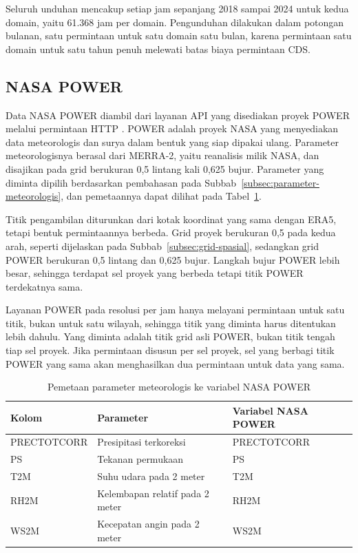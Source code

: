 Seluruh unduhan mencakup setiap jam sepanjang 2018 sampai 2024 untuk kedua domain, yaitu 61.368 jam per domain.
Pengunduhan dilakukan dalam potongan bulanan, satu permintaan untuk satu domain satu bulan, karena permintaan satu domain untuk satu tahun penuh melewati batas biaya permintaan CDS.

\subsection{NASA POWER}
\label{subsec:power}
Data NASA POWER diambil dari layanan API yang disediakan proyek POWER melalui permintaan HTTP \autocite{nasapower}.
POWER adalah proyek NASA yang menyediakan data meteorologis dan surya dalam bentuk yang siap dipakai ulang.
Parameter meteorologisnya berasal dari MERRA-2, yaitu reanalisis milik NASA, dan disajikan pada grid berukuran 0,5\textdegree{} lintang kali 0,625\textdegree{} bujur.
Parameter yang diminta dipilih berdasarkan pembahasan pada Subbab~\ref{subsec:parameter-meteorologis}, dan pemetaannya dapat dilihat pada Tabel~\ref{tab:power-variabel}.

Titik pengambilan diturunkan dari kotak koordinat yang sama dengan ERA5, tetapi bentuk permintaannya berbeda.
Grid proyek berukuran 0,5\textdegree{} pada kedua arah, seperti dijelaskan pada Subbab~\ref{subsec:grid-spasial}, sedangkan grid POWER berukuran 0,5\textdegree{} lintang dan 0,625\textdegree{} bujur.
Langkah bujur POWER lebih besar, sehingga terdapat sel proyek yang berbeda tetapi titik POWER terdekatnya sama.

Layanan POWER pada resolusi per jam hanya melayani permintaan untuk satu titik, bukan untuk satu wilayah, sehingga titik yang diminta harus ditentukan lebih dahulu.
Yang diminta adalah titik grid asli POWER, bukan titik tengah tiap sel proyek.
Jika permintaan disusun per sel proyek, sel yang berbagi titik POWER yang sama akan menghasilkan dua permintaan untuk data yang sama.

\begin{table}[!t]
  \caption{Pemetaan parameter meteorologis ke variabel NASA POWER}
  \label{tab:power-variabel}
  \footnotesize
  \begin{tabular}{ | l | p{} | p{} | }
    \hline
    Kolom & Parameter & Variabel NASA POWER \\
    \hline
    PRECTOTCORR & Presipitasi terkoreksi & PRECTOTCORR \\
    PS & Tekanan permukaan & PS \\
    T2M & Suhu udara pada 2 meter & T2M \\
    RH2M & Kelembapan relatif pada 2 meter & RH2M \\
    WS2M & Kecepatan angin pada 2 meter & WS2M \\
    \hline
  \end{tabular}
\end{table}

